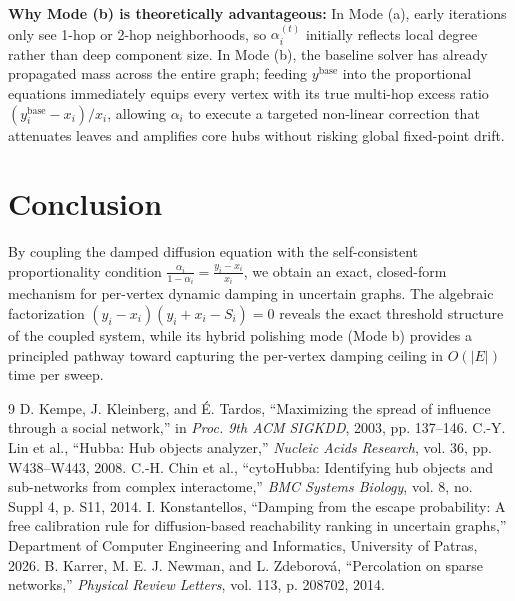 \documentclass[11pt, a4paper]{article}
\begin{document}
\noindent\textbf{Why Mode (b) is theoretically advantageous:} In Mode (a), early iterations only see 1-hop or 2-hop neighborhoods, so $\alpha_i^{(t)}$ initially reflects local degree rather than deep component size. In Mode (b), the baseline solver has already propagated mass across the entire graph; feeding $y^{\mathrm{base}}$ into the proportional equations immediately equips every vertex with its true multi-hop excess ratio $(y_i^{\mathrm{base}} - x_i)/x_i$, allowing $\alpha_i$ to execute a targeted non-linear correction that attenuates leaves and amplifies core hubs without risking global fixed-point drift.

\section{Conclusion}

By coupling the damped diffusion equation with the self-consistent proportionality condition $\frac{\alpha_i}{1 - \alpha_i} = \frac{y_i - x_i}{x_i}$, we obtain an exact, closed-form mechanism for per-vertex dynamic damping in uncertain graphs. The algebraic factorization $(y_i - x_i)(y_i + x_i - S_i) = 0$ reveals the exact threshold structure of the coupled system, while its hybrid polishing mode (Mode b) provides a principled pathway toward capturing the per-vertex damping ceiling in $O(|E|)$ time per sweep.

\begin{thebibliography}{9}
 D. Kempe, J. Kleinberg, and \'{E}. Tardos, ``Maximizing the spread of influence through a social network,'' in \textit{Proc. 9th ACM SIGKDD}, 2003, pp. 137--146.
 C.-Y. Lin et al., ``Hubba: Hub objects analyzer,'' \textit{Nucleic Acids Research}, vol. 36, pp. W438--W443, 2008.
 C.-H. Chin et al., ``cytoHubba: Identifying hub objects and sub-networks from complex interactome,'' \textit{BMC Systems Biology}, vol. 8, no. Suppl 4, p. S11, 2014.
 I. Konstantellos, ``Damping from the escape probability: A free calibration rule for diffusion-based reachability ranking in uncertain graphs,'' Department of Computer Engineering and Informatics, University of Patras, 2026.
 B. Karrer, M. E. J. Newman, and L. Zdeborov\'{a}, ``Percolation on sparse networks,'' \textit{Physical Review Letters}, vol. 113, p. 208702, 2014.
\end{thebibliography}
\end{document}

